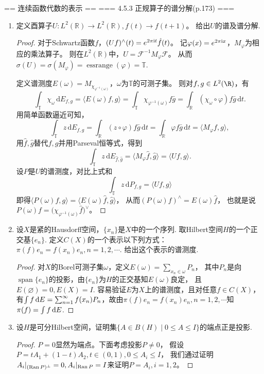 == 连续函数代数的表示 ==
=== 4.5.3 正规算子的谱分解(p.173) ===
\begin{enumerate}
\item[2]
定义酉算子$U:L^2(\mathbb{R})\rightarrow L^2(\mathbb{R}),f(t)\rightarrow f(t+1)$。
给出$U$的谱及谱分解.
\begin{proof}
对于Schwartz函数$f$，$(Uf)^\wedge(t)=e^{2\pi{\rm i}t}\hat{f}(t)$。
记$\varphi(x)=e^{2\pi{\rm i}x}$，$M_\varphi$为相应的乘法算子。
则在$L^2(\mathbb{R})$中，$U=\mathcal{F}^{-1}M_\varphi\mathcal{F}$。
从而$\sigma(U)=\sigma(M_\varphi)=\operatorname{essrange}(\varphi)=\mathbb{T}$.

定义谱测度$E(\omega)=M_{\chi_{\varphi^{-1}(\omega)}}$，$\omega$为$\mathbb{T}$的可测子集。
则对$f,g\in L^2(\R)$，有
\[\int_{\mathbb{T}}\chi_\omega \,\mathrm{d}E_{f,g}=\langle E(\omega)f,g\rangle  
=\int_{\mathbb{T}}\chi_{\varphi^{-1}(\omega)}f\bar{g}
=\int_\mathbb{R}(\chi_\omega\circ\varphi) f \bar{g} \,\mathrm{d}t.\]
用简单函数逼近可知，\[\int_{\mathbb{T}}z \,\mathrm{d}E_{f,g}
=\int_\mathbb{R}(z\circ\varphi) f \bar{g} \,\mathrm{d}t
=\int_\mathbb{R}\varphi f \bar{g} \,\mathrm{d}t=\langle M_\varphi f,g \rangle,\]
用$\hat{f},\hat{g}$替代$f,g$并用Parseval恒等式，得到
\[\int_{\mathbb{T}}z\,\mathrm{d}E_{\hat{f},\hat{g}}
=\langle M_\varphi\hat{f},\hat{g}\rangle=\langle Uf,g\rangle.\]
设$P$是$U$的谱测度，对比上式和
\[\int_{\mathbb{T}}z\,\mathrm{d}P_{f,g}=\langle Uf,g\rangle\]
即得$\langle P(\omega)f,g \rangle=\langle E(\omega)\hat{f},\hat{g} \rangle$，
从而$(P(\omega)f)^{\wedge}=E(\omega)\hat{f}$，
也就是说$P(\omega)f=\big(\chi_{\varphi^{-1}(\omega)}\hat{f}\big)^{\vee}$。
\end{proof}

\item[3]
设$X$是紧的Hausdorff空间，$\{x_n\}$是$X$中的一个序列. 取Hilbert空间$H$的一个正交基$\{e_n\}$.
定义$C(X)$的一个表示以下列方式：$\pi(f)e_n=f(x_n)e_n,n=1,2,\cdots$. 给出这个表示的谱测度.
\begin{proof}
    对$X$的Borel可测子集$\omega$，定义$E(\omega)=\sum_{x_n\in\omega}P_n$，
    其中$P_n$是向$\operatorname{span}\{e_n\}$的投影，由$\{e_n\}$为$H$的正交基知$E(\omega)$良定，
    且$E(\varnothing)=0,E(X)=I$. 容易验证$E$为$X$上的谱测度，且对任意$f\in C(X)$，
    有$\int f\,{\rm d}E=\sum_{n=1}^\infty f(x_n)P_n$，故由$\pi(f)e_n=f(x_n)e_n,n=1,2,\cdots$知$\pi(f)=\int f\,{\rm d}E$.
\end{proof}

\item[4]
设$H$是可分Hilbert空间，证明集$\{A\in B(H)\mid 0\leqslant A\leqslant I\}$的端点正是投影.
\begin{proof}
$P=0$显然为端点。下面考虑投影$P\neq 0$，
假设$P=tA_1+(1-t)A_2,t\in (0,1),0\leqslant A_i \leqslant I$，
我们通过证明$A_i|_{(\operatorname{Ran} P)^\perp}=0,A_i|_{\operatorname{Ran} P}=I$来证明$P=A_i,i=1,2$。


\end{proof}
\end{enumerate}
